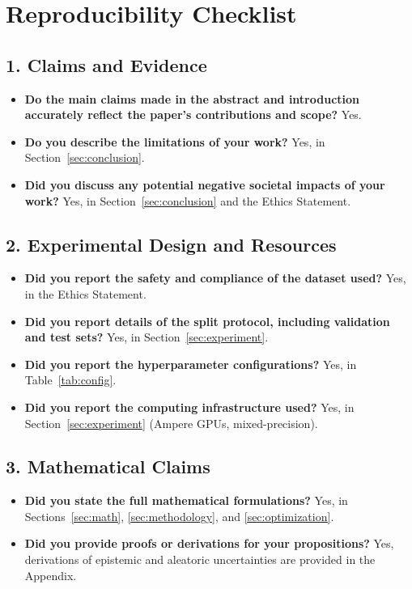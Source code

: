 \documentclass[letterpaper]{article} %
\begin{document}





\section*{Reproducibility Checklist}

\subsection*{1. Claims and Evidence}
\begin{itemize}
    \item \textbf{Do the main claims made in the abstract and introduction accurately reflect the paper's contributions and scope?} Yes.
    \item \textbf{Do you describe the limitations of your work?} Yes, in Section~\ref{sec:conclusion}.
    \item \textbf{Did you discuss any potential negative societal impacts of your work?} Yes, in Section~\ref{sec:conclusion} and the Ethics Statement.
\end{itemize}

\subsection*{2. Experimental Design and Resources}
\begin{itemize}
    \item \textbf{Did you report the safety and compliance of the dataset used?} Yes, in the Ethics Statement.
    \item \textbf{Did you report details of the split protocol, including validation and test sets?} Yes, in Section~\ref{sec:experiment}.
    \item \textbf{Did you report the hyperparameter configurations?} Yes, in Table~\ref{tab:config}.
    \item \textbf{Did you report the computing infrastructure used?} Yes, in Section~\ref{sec:experiment} (Ampere GPUs, mixed-precision).
\end{itemize}

\subsection*{3. Mathematical Claims}
\begin{itemize}
    \item \textbf{Did you state the full mathematical formulations?} Yes, in Sections~\ref{sec:math}, \ref{sec:methodology}, and \ref{sec:optimization}.
    \item \textbf{Did you provide proofs or derivations for your propositions?} Yes, derivations of epistemic and aleatoric uncertainties are provided in the Appendix.
\end{itemize}
\end{document}
